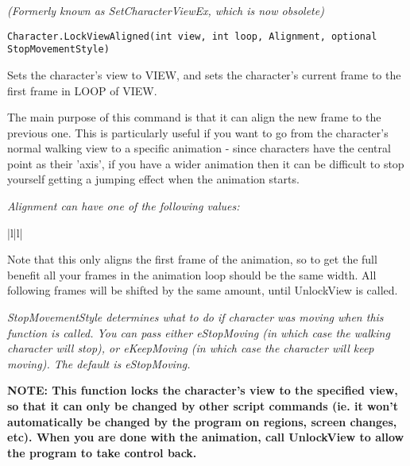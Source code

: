 \it{(Formerly known as SetCharacterViewEx, which is now obsolete)}

\begin{verbatim}
Character.LockViewAligned(int view, int loop, Alignment, optional StopMovementStyle)
\end{verbatim}

Sets the character's view to VIEW, and sets the character's current frame to
the first frame in LOOP of VIEW.

The main purpose of this command is that it can align the new frame to the previous one.
This is particularly useful if you want to go from the character's normal walking view to
a specific animation - since characters have the central point as their 'axis', if
you have a wider animation then it can be difficult to stop yourself getting a jumping
effect when the animation starts.

\it{Alignment} can have one of the following values:

\begin{tabular}{|l|l|}
\end{tabular}

Note that this only aligns the first frame of the animation, so to get the full benefit
all your frames in the animation loop should be the same width. All following frames will
be shifted by the same amount, until UnlockView is called.

\it{StopMovementStyle} determines what to do if character was moving when this function is called. You can pass either eStopMoving (in which case the walking character will stop), or eKeepMoving (in which case the character will keep moving). The default is eStopMoving.

\bf{NOTE:} This function locks the character's view to the specified view, so
that it can only be changed by other script commands (ie. it won't
automatically be changed by the program on regions, screen changes,
etc). When you are done with the animation, call UnlockView to
allow the program to take control back.


